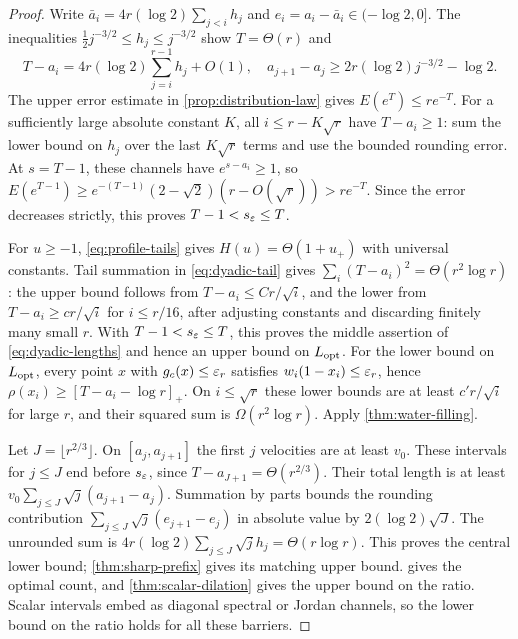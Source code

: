 \begin{proof}
Write $\bar a_i=4r(\log2)\sum_{j<i}h_j$ and
$e_i=a_i-\bar a_i\in(-\log2,0]$. The inequalities
$\frac12j^{-3/2}\leq h_j\leq j^{-3/2}$ show $T=\Theta(r)$ and
\begin{equation}
 T-a_i=4r(\log2)\sum_{j=i}^{r-1}h_j+O(1),\quad
 a_{j+1}-a_j\geq2r(\log2)j^{-3/2}-\log2.
 \label{eq:dyadic-tail}
\end{equation}
The upper error estimate in \cref{prop:distribution-law} gives
$E(e^T)\leq re^{-T}$. For a sufficiently large absolute constant $K$,
all $i\leq r-K\sqrt r$ have $T-a_i\geq1$: sum the lower bound on
$h_j$ over the last $K\sqrt r$ terms and use the bounded rounding error.
At $s=T-1$, these channels have $e^{s-a_i}\geq1$, so
$E(e^{T-1})\geq e^{-(T-1)}(2-\sqrt2)(r-O(\sqrt r))>re^{-T}$.
Since the error decreases strictly, this proves $T-1<s_\varepsilon\leq T$.

For $u\geq-1$, \eqref{eq:profile-tails} gives
$H(u)=\Theta(1+u_+)$ with universal constants. Tail summation in
\eqref{eq:dyadic-tail} gives
$\sum_i(T-a_i)^2=\Theta(r^2\log r)$: the upper bound follows from
$T-a_i\leq Cr/\sqrt i$, and the lower from
$T-a_i\geq cr/\sqrt i$ for $i\leq r/16$, after adjusting constants
and discarding finitely many small $r$. With $T-1<s_\varepsilon\leq T$, this
proves the middle assertion of \eqref{eq:dyadic-lengths} and hence an
upper bound on $L_{\mathrm{opt}}$.
For the lower bound on $L_{\mathrm{opt}}$, every point $x$ with
$g_c(x)\leq\varepsilon_r$ satisfies
$w_i(1-x_i)\leq\varepsilon_r$, hence
$\rho(x_i)\geq[T-a_i-\log r]_+$. On $i\leq\sqrt r$ these lower
bounds are at least $c'r/\sqrt i$ for large $r$, and their squared sum
is $\Omega(r^2\log r)$. Apply \cref{thm:water-filling}.

Let $J=\lfloor r^{2/3}\rfloor$. On $[a_j,a_{j+1}]$ the first $j$
velocities are at least $v_0$. These intervals for $j\leq J$ end before
$s_\varepsilon$, since $T-a_{J+1}=\Theta(r^{2/3})$. Their total length is at
least $v_0\sum_{j\leq J}\sqrt j(a_{j+1}-a_j)$. Summation by parts
bounds the rounding contribution
$\sum_{j\leq J}\sqrt j(e_{j+1}-e_j)$ in absolute value by
$2(\log2)\sqrt J$. The unrounded sum is
$4r(\log2)\sum_{j\leq J}\sqrt jh_j=\Theta(r\log r)$.
This proves the central lower bound; \cref{thm:sharp-prefix} gives
its matching upper bound.  gives the optimal
count, and \cref{thm:scalar-dilation} gives the upper bound on the
ratio. Scalar intervals embed as diagonal spectral or Jordan channels,
so the lower bound on the ratio holds for all these barriers.
\end{proof}


